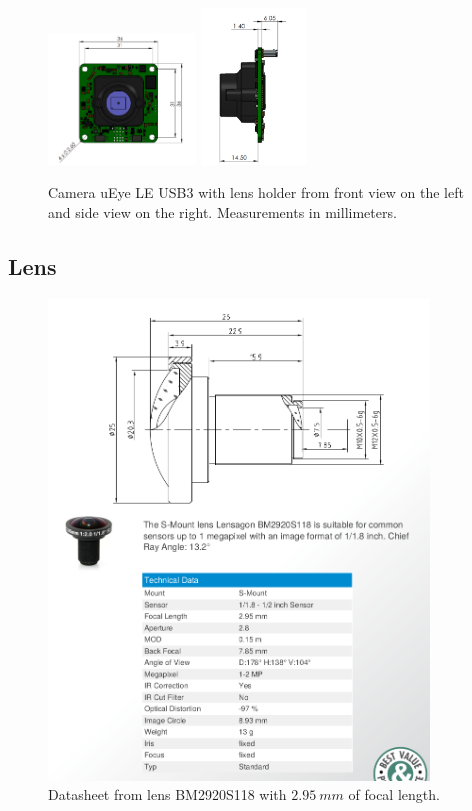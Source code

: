 \begin{figure}[ht]
	\centering
	\includegraphics[width=0.35\textwidth]{images/camwlensfront.png}
	\includegraphics[width=0.25\textwidth]{images/camwlensside.png}
	\caption[Camera uEye LE USB3 with lens holder]{Camera uEye LE USB3 with lens holder from front view on the left and side view on the right. Measurements in millimeters.}
	\label{appendix:cha2:camwlens}
\end{figure}

\subsection{Lens}
\begin{figure}[ht]
	\centering
	\includegraphics[width=0.9\textwidth]{images/lens.png}
	\caption[Lens BM2920S118 $2.95 \ mm$]{Datasheet from lens BM2920S118 with  $2.95 \ mm$ of focal length.}
	\label{appendix:cha2:lens}
\end{figure}

